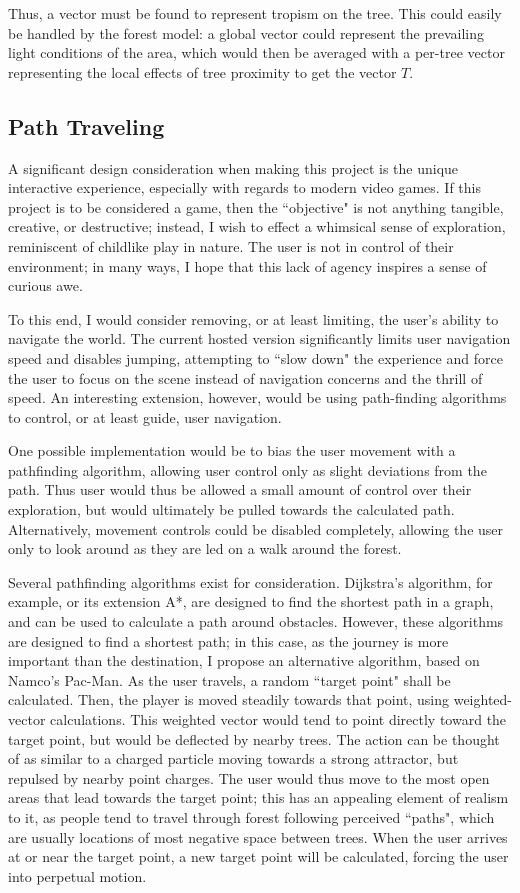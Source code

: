 \documentclass{article}
\newcommand{\tab}{\hspace*{2em}}
\begin{document}
    \tab Thus, a vector must be found to represent tropism on the tree. This could easily be
handled by the forest model: a global vector could represent the prevailing light conditions of the
area, which would then be averaged with a per-tree vector representing the local effects of tree
proximity to get the vector $T$.

        \subsection{Path Traveling}
    \tab A significant design consideration when making this project is the unique interactive
experience, especially with regards to modern video games. If this project is to be considered a
game, then the ``objective" is not anything tangible, creative, or destructive; instead, I wish to
effect a whimsical sense of exploration, reminiscent of childlike play in nature. The user is not
in control of their environment; in many ways, I hope that this lack of agency inspires a sense of
curious awe.

    \tab To this end, I would consider removing, or at least limiting, the user's ability to
navigate the world. The current hosted version significantly limits user navigation speed and
disables jumping, attempting to ``slow down" the experience and force the user to focus on the
scene instead of navigation concerns and the thrill of speed. An interesting extension, however,
would be using path-finding algorithms to control, or at least guide, user navigation. 

    \tab One possible implementation would be to bias the user movement with a pathfinding
algorithm, allowing user control only as slight deviations from the path. Thus user would thus be
allowed a small amount of control over their exploration, but would ultimately be pulled towards
the calculated path. Alternatively, movement controls could be disabled completely, allowing the
user only to look around as they are led on a walk around the forest.

    \tab Several pathfinding algorithms exist for consideration. Dijkstra's algorithm, for example,
or its extension A*, are designed to find the shortest path in a graph, and can be used to
calculate a path around obstacles. However, these algorithms are designed to find a shortest path;
in this case, as the journey is more important than the destination, I propose an alternative
algorithm, based on Namco's Pac-Man\cite{pittman11}. As the user travels, a random ``target point"
shall be calculated. Then, the player is moved steadily towards that point, using weighted-vector
calculations. This weighted vector would tend to point directly toward the target point, but would
be deflected by nearby trees. The action can be thought of as similar to a charged particle moving
towards a strong attractor, but repulsed by nearby point charges. The user would thus move to
the most open areas that lead towards the target point; this has an appealing element of realism to
it, as people tend to travel through forest following perceived ``paths", which are usually
locations of most negative space between trees. When the user arrives at or near the target point,
a new target point will be calculated, forcing the user into perpetual motion.
\end{document}
